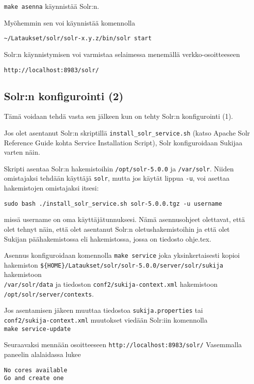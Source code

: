 \documentclass[12pt,a4paper]{scrartcl}
\begin{document}
\verb|make asenna| käynnistää Solr:n.

Myöhemmin sen voi käynnistää komennolla

\verb|~/Lataukset/solr/solr-x.y.z/bin/solr start|


Solr:n käynnistymisen voi varmistaa selaimessa menemällä verkko-osoitteeseen

\verb|http://localhost:8983/solr/|


\subsection*{Solr:n konfigurointi (2)}

Tämä voidaan tehdä vasta sen jälkeen kun on tehty Solr:n konfigurointi (1).

Jos olet asentanut Solr:n skriptillä \verb=install_solr_service.sh=
(katso Apache Solr Reference Guide kohta
Service Installation Script),
Solr konfiguroidaan Sukijaa varten näin.

Skripti asentaa Solr:n hakemistoihin \verb=/opt/solr-5.0.0= ja
\verb=/var/solr=. Niiden omistajaksi tehdään käyttäjä \verb=solr=,
mutta jos käytät lippua \verb=-u=, voi asettaa hakemistojen
omistajaksi itsesi:

\verb=sudo bash ./install_solr_service.sh solr-5.0.0.tgz -u username=

missä username on oma käyttäjätunnuksesi. Nämä asennusohjeet
olettavat, että olet tehnyt näin, että olet asentanut Solr:n
oletushakemistoihin ja että olet Sukijan päähakemistossa eli
hakemistossa, jossa on tiedosto ohje.tex.

Asennus konfiguroidaan komennolla \verb=make service=
joka yksinkertaisesti kopioi hakemiston
\verb=${HOME}/Lataukset/solr/solr-5.0.0/server/solr/sukija=
hakemistoon \\
\verb=/var/solr/data= ja tiedoston
\verb=conf2/sukija-context.xml= hakemistoon \\
\verb=/opt/solr/server/contexts=.


Jos asentamisen jäkeen muuttaa tiedostoa
\verb|sukija.properties| tai \\
\verb|conf2/sukija-context.xml|
muutokset viedään Solr:iin komennolla \\
\verb=make service-update=

Seuraavaksi mennään osoitteeseen \verb=http://localhost:8983/solr/=
Vasemmalla paneelin alalaidassa lukee 

\begin{verbatim}
No cores available
Go and create one
\end{verbatim}
\end{document}
